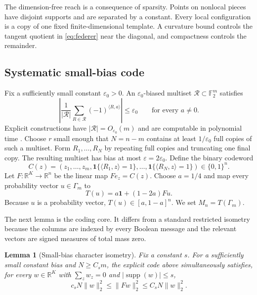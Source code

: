 \documentclass{article}
\newtheorem{lemma}[theorem]{Lemma}
\theoremstyle{definition}
\theoremstyle{remark}
\newcommand{\Ftwo}{\mathbb F_2}
\newcommand{\R}{\mathbb R}
\newcommand{\1}{\mathbf 1}
\newcommand{\supp}{\operatorname{supp}}
\begin{document}
The dimension-free reach is a consequence of sparsity. Points on nonlocal pieces have disjoint supports and are separated by a constant. Every local configuration is a copy of one fixed finite-dimensional template. A curvature bound controls the tangent quotient in \eqref{eq:federer} near the diagonal, and compactness controls the remainder.

\subsection{Systematic small-bias code}

Fix a sufficiently small constant $\varepsilon_0>0$. An $\varepsilon_0$-biased multiset $\mathcal R\subset\Ftwo^m$ satisfies \[ \left|\frac1{|\mathcal R|}\sum_{R\in\mathcal R}(-1)^{\langle R,a\rangle}\right|\leq\varepsilon_0 \qquad\text{for every }a\ne0. \] Explicit constructions have $|\mathcal R|=O_{\varepsilon_0}(m)$ and are computable in polynomial time \citep{naor1993smallbias,tashma2017balanced}. Choose $r$ small enough that $N=n-m$ contains at least $1/\varepsilon_0$ full copies of such a multiset. Form $R_1,\ldots,R_N$ by repeating full copies and truncating one final copy. The resulting multiset has bias at most $\varepsilon=2\varepsilon_0$. Define the binary codeword
\begin{equation}
C(z)=\left(z_1,\ldots,z_m,
\mathbf1\{\langle R_1,z\rangle=1\},\ldots,
\mathbf1\{\langle R_N,z\rangle=1\}\right)\in\{0,1\}^n.
\label{eq:code}
\end{equation}
Let $F:\R^K\to\R^n$ be the linear map $Fe_z=C(z)$. Choose $a=1/4$ and map every probability vector $u\in\Gamma_m$ to
\begin{equation}
T(u)=a\1+(1-2a)Fu.
\label{eq:affine-map}
\end{equation}
Because $u$ is a probability vector, $T(u)\in[a,1-a]^n$. We set $M_n=T(\Gamma_m)$.

The next lemma is the coding core. It differs from a standard restricted isometry because the columns are indexed by every Boolean message and the relevant vectors are signed measures of total mass zero.

\begin{lemma}[Small-bias character isometry]
\label{lem:rip}
Fix a constant $s$. For a sufficiently small constant bias and $N\geq C_s m$, the explicit code above simultaneously satisfies, for every $w\in\R^K$ with $\sum_z w_z=0$ and $|\supp(w)|\leq s$,
\begin{equation}
c_sN\|w\|_2^2\leq\|Fw\|_2^2\leq C_sN\|w\|_2^2.
\label{eq:rip}
\end{equation}
\end{lemma}
\end{document}
